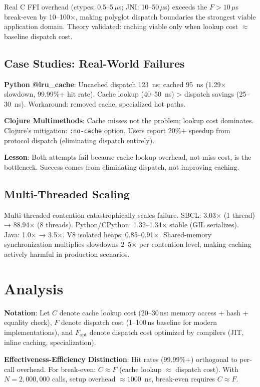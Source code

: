 \documentclass[sigplan,final,acmsmall,review,screen]{acmart}
\begin{document}
Real C FFI overhead (ctypes: 0.5--5\,$\mu$s; JNI: 10--50\,$\mu$s) exceeds the $F > 10\,\mu$s break-even by 10--100$\times$, making polyglot dispatch boundaries the strongest viable application domain. Theory validated: caching viable only when lookup cost $\approx$ baseline dispatch cost.

\subsection{Case Studies: Real-World Failures}
\label{sec:case-studies}

\textbf{Python @lru\_cache}: Uncached dispatch 123~ns; cached 95~ns (1.29× slowdown, 99.99\%+ hit rate). Cache lookup (40--50~ns) > dispatch savings (25--30~ns). Workaround: removed cache, specialized hot paths.

\textbf{Clojure Multimethods}: Cache misses not the problem; lookup cost dominates. Clojure's mitigation: \texttt{:no-cache} option. Users report 20\%+ speedup from protocol dispatch (eliminating dispatch entirely).

\textbf{Lesson}: Both attempts fail because cache lookup overhead, not miss cost, is the bottleneck. Success comes from eliminating dispatch, not improving caching.

\subsection{Multi-Threaded Scaling}
\label{sec:multi-threading}

Multi-threaded contention catastrophically scales failure. SBCL: 3.03× (1 thread) → 88.94× (8 threads). Python/CPython: 1.32–1.34× stable (GIL serializes). Java: 1.0× → 3.5×. V8 isolated heaps: 0.85--0.91×. Shared-memory synchronization multiplies slowdowns 2--5× per contention level, making caching actively harmful in production scenarios.

\section{Analysis}

\textbf{Notation}: Let $C$ denote cache lookup cost (20--30\,ns: memory access + hash + equality check), $F$ denote dispatch cost (1--100\,ns baseline for modern implementations), and $F_{\text{opt}}$ denote dispatch cost optimized by compilers (JIT, inline caching, specialization).

\textbf{Effectiveness-Efficiency Distinction}: Hit rates (99.99\%+) orthogonal to per-call overhead. For break-even: $C \approx F$ (cache lookup $\approx$ dispatch cost). With $N=2,000,000$ calls, setup overhead $\approx 1000$~ns, break-even requires $C \approx F$.
\end{document}
